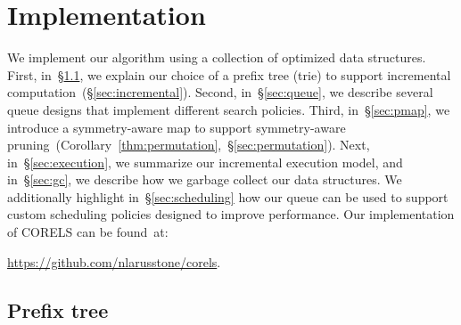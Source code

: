 

\section{Implementation}
\label{sec:implementation}

We implement our algorithm using a collection of optimized data structures.
%
First, in~\S\ref{sec:trie}, we explain our choice of a prefix tree (trie)
to support incremental computation~(\S\ref{sec:incremental}).
%
Second, in~\S\ref{sec:queue}, we describe several queue designs
that implement different search policies.
%
Third, in~\S\ref{sec:pmap}, we introduce a symmetry-aware map to support
symmetry-aware pruning~(Corollary~\ref{thm:permutation},~\S\ref{sec:permutation}).
%
Next, in~\S\ref{sec:execution}, we summarize our incremental execution model,
and in~\S\ref{sec:gc}, we describe how we garbage collect our data structures.
%
We additionally highlight in~\S\ref{sec:scheduling} how our queue can be used to support
custom scheduling policies designed to improve performance.
%
Our implementation of CORELS can be found~at: \\

\centerline{\url{https://github.com/nlarusstone/corels}.}

\subsection{Prefix tree}
\label{sec:trie}

